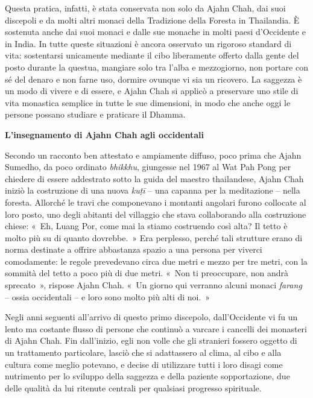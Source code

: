 Questa pratica, infatti, è stata conservata non solo da Ajahn Chah, dai
suoi discepoli e da molti altri monaci della Tradizione della Foresta in
Thailandia. È sostenuta anche dai suoi monaci e dalle sue monache in
molti paesi d'Occidente e in India. In tutte queste situazioni è ancora
osservato un rigoroso standard di vita: sostentarsi unicamente mediante
il cibo liberamente offerto dalla gente del posto durante la questua,
mangiare solo tra l'alba e mezzogiorno, non portare con sé del denaro e
non farne uso, dormire ovunque vi sia un ricovero. La saggezza è un modo
di vivere e di essere, e Ajahn Chah si applicò a preservare uno stile di
vita monastica semplice in tutte le sue dimensioni, in modo che anche
oggi le persone possano studiare e praticare il Dhamma.

\textbf{L'insegnamento di Ajahn Chah agli occidentali}

Secondo un racconto ben attestato e ampiamente diffuso, poco prima che
Ajahn Sumedho, da poco ordinato \emph{bhikkhu}, giungesse nel 1967 al
Wat Pah Pong per chiedere di essere addestrato sotto la guida del
maestro thailandese, Ajahn Chah iniziò la costruzione di una nuova
\emph{kuṭī} -- una capanna per la meditazione -- nella foresta. Allorché
le travi che componevano i montanti angolari furono collocate al loro
posto, uno degli abitanti del villaggio che stava collaborando alla
costruzione chiese: «~Eh, Luang Por, come mai la stiamo costruendo così
alta? Il tetto è molto più su di quanto dovrebbe.~» Era perplesso,
perché tali strutture erano di norma destinate a offrire abbastanza
spazio a una persona per viverci comodamente: le regole prevedevano
circa due metri e mezzo per tre metri, con la sommità del tetto a poco
più di due metri. «~Non ti preoccupare, non andrà sprecato~», rispose
Ajahn Chah. «~Un giorno qui verranno alcuni monaci \emph{farang} --
ossia occidentali -- e loro sono molto più alti di noi.~»

Negli anni seguenti all'arrivo di questo primo discepolo,
dall'Occidente vi fu un lento ma costante flusso di persone che
continuò a varcare i cancelli dei monasteri di Ajahn Chah. Fin
dall'inizio, egli non volle che gli stranieri fossero oggetto di un
trattamento particolare, lasciò che si adattassero al clima, al cibo e
alla cultura come meglio potevano, e decise di utilizzare tutti i loro
disagi come nutrimento per lo sviluppo della saggezza e della paziente
sopportazione, due delle qualità da lui ritenute centrali per qualsiasi
progresso spirituale.

